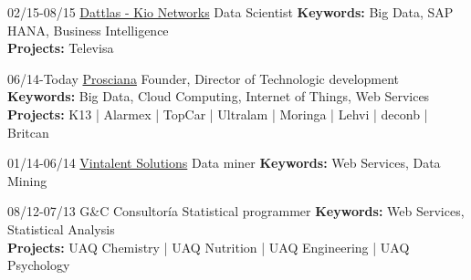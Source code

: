 \documentclass[]{friggeri-cv}
\begin{document}
\begin{entrylist}
\entry
{02/15-08/15}
{\href{http://www.dattlas.com}{Dattlas - Kio Networks}}
{Data Scientist} 
{\textbf{Keywords:} Big Data, SAP HANA, Business Intelligence\\
\textbf{Projects:} Televisa
}

\entry
{06/14-Today}
{\href{http://www.prosciana.com}{Prosciana}}
{Founder, Director of Technologic development} 
{\textbf{Keywords:} Big Data, Cloud Computing, Internet of Things, Web Services\\
\textbf{Projects:} K13 | Alarmex | TopCar | Ultralam | Moringa | Lehvi | deconb | Britcan
}

\entry
{01/14-06/14}
{\href{http://www.vintalent.com}{Vintalent Solutions}}
{Data miner}
{\textbf{Keywords:} Web Services, Data Mining}


\entry
{%
08/12-07/13}
{G\&C Consultor\'{i}a}
{Statistical programmer}
{\textbf{Keywords:} Web Services, Statistical Analysis\\
\textbf{Projects:} UAQ Chemistry | UAQ Nutrition | UAQ Engineering | UAQ Psychology 
}



%
\end{entrylist}
\end{document}
